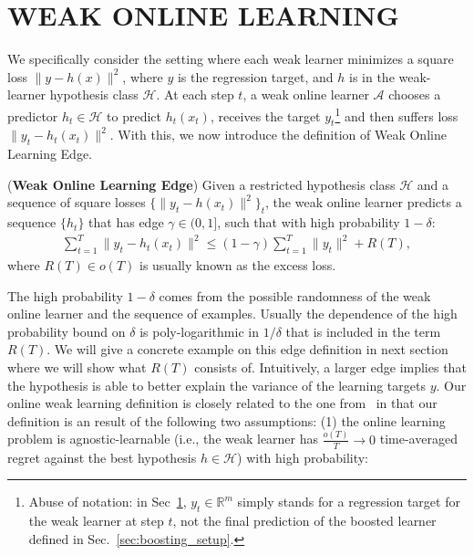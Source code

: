 \section{WEAK ONLINE LEARNING}
\label{sec:weak_learn}
We specifically consider the setting where each weak learner minimizes a square loss \mbox{$\|y - h(x)\|^2$}, where  $y$ is the regression target, and $h$ is in the weak-learner hypothesis class $\mathcal{H}$.
At each step $t$, a weak online learner $\mathcal{A}$ chooses a predictor $h_t \in \mathcal{H}$ to predict $h_t(x_t)$, receives the target $y_t$\footnote{Abuse of notation: in Sec~\ref{sec:weak_learn}, $y_t\in\mathbb{R}^m$ simply stands for a regression target for the weak learner at step $t$, not the final prediction of the boosted learner defined in Sec.~\ref{sec:boosting_setup}.} and then suffers loss $\|y_t - h_t(x_t)\|^2$. With this, we now introduce the definition of Weak Online Learning Edge.
\begin{definition}
\label{def:weak_learning}(\textbf{Weak Online Learning Edge}) Given a restricted hypothesis class $\mathcal{H}$ and a sequence of square losses $\{\|y_t - h(x_t)\|^2\}_t$, the weak online learner predicts a sequence $\{h_t\}$ that has edge $\gamma \in (0,1]$, such that with high probability $1-\delta$:
\begin{align}
\label{eq:weak_learner_eq}
\sum_{t=1}^T \|y_t - h_t(x_t)\|^2\leq (1-\gamma)\sum_{t=1}^T \|y_t\|^2 + R(T),
\end{align} where $R(T)\in o(T)$ is usually known as the excess loss. 
\end{definition} The high probability $1-\delta$ comes from the possible randomness of the weak online learner and the sequence of examples. Usually the dependence of the high probability bound on $\delta$ is poly-logarithmic in $1/\delta$ that is included in the term $R(T)$. We will give a concrete example on this edge definition in next section where we will show what $R(T)$ consists of.  Intuitively, a larger edge implies that the hypothesis is able to better explain the variance of the learning targets $y$. Our online weak learning definition is closely related to the one from~\citep{beygelzimer2015optimal} in that our definition is an result of the following two assumptions: (1) the online learning problem is agnostic-learnable (i.e., the weak learner has $\frac{o(T)}{T} \rightarrow 0$ time-averaged regret against the best hypothesis $h \in \mathcal{H}$) with high probability:
